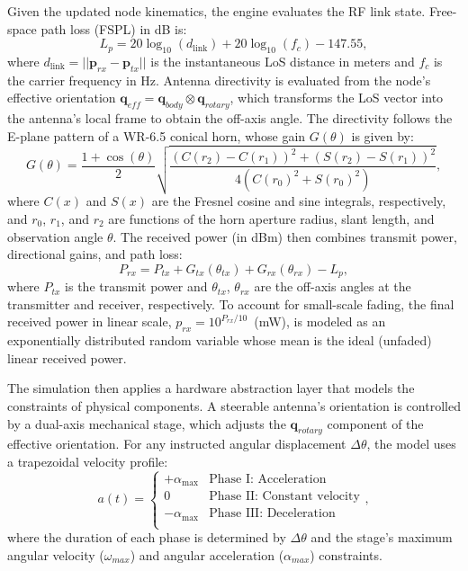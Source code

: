 \documentclass[fleqn,10pt]{wlscirep}
\begin{document}
Given the updated node kinematics, the engine evaluates the RF link state. Free-space path loss (FSPL) in dB is:
\begin{equation}
    L_{p} = 20 \log_{10}(d_{\text{link}}) + 20 \log_{10}(f_c) - 147.55,
\end{equation}
where $d_{\text{link}} = ||\mathbf{p}_{rx} - \mathbf{p}_{tx}||$ is the instantaneous LoS distance in meters and $f_c$ is the carrier frequency in Hz. Antenna directivity is evaluated from the node's effective orientation $\mathbf{q}_{eff} = \mathbf{q}_{body} \otimes \mathbf{q}_{rotary}$, which transforms the LoS vector into the antenna's local frame to obtain the off-axis angle. The directivity follows the E-plane pattern of a WR-6.5 conical horn, whose gain $G(\theta)$ is given by:
\begin{equation}
    G(\theta) = \frac{1 + \cos(\theta)}{2} \sqrt{\frac{(C(r_2) - C(r_1))^2 + (S(r_2) - S(r_1))^2}{4(C(r_0)^2 + S(r_0)^2)}},
\end{equation}
where $C(x)$ and $S(x)$ are the Fresnel cosine and sine integrals, respectively, and $r_0$, $r_1$, and $r_2$ are functions of the horn aperture radius, slant length, and observation angle $\theta$. The received power (in dBm) then combines transmit power, directional gains, and path loss:
\begin{equation}
P_{rx} = P_{tx} + G_{tx}(\theta_{tx}) + G_{rx}(\theta_{rx}) - L_p,
\end{equation}
where $P_{tx}$ is the transmit power and $\theta_{tx}$, $\theta_{rx}$ are the off-axis angles at the transmitter and receiver, respectively. To account for small-scale fading, the final received power in linear scale, $p_{rx} = 10^{P_{rx}/10}$~(mW), is modeled as an exponentially distributed random variable whose mean is the ideal (unfaded) linear received power.

The simulation then applies a hardware abstraction layer that models the constraints of physical components. A steerable antenna's orientation is controlled by a dual-axis mechanical stage, which adjusts the $\mathbf{q}_{rotary}$ component of the effective orientation. For any instructed angular displacement $\Delta\theta$, the model uses a trapezoidal velocity profile:
\begin{equation}
	a(t) =
	\begin{cases}
		+\alpha_{\text{max}} & \text{Phase I: Acceleration}       \\
		0               & \text{Phase II: Constant velocity} \\
		-\alpha_{\text{max}} & \text{Phase III: Deceleration}     \\
	\end{cases},
\end{equation}
where the duration of each phase is determined by $\Delta\theta$ and the stage's maximum angular velocity ($\omega_{max}$) and angular acceleration ($\alpha_{max}$) constraints.
\end{document}
